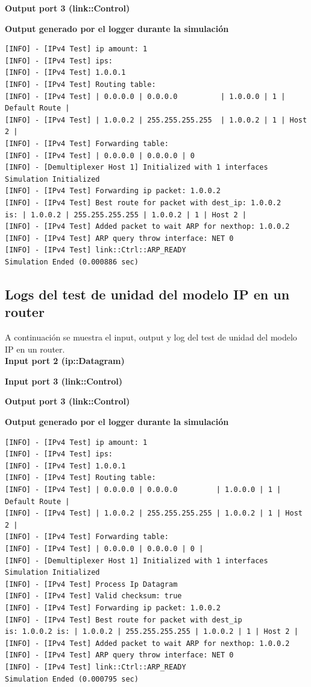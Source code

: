 \documentclass[10pt,a4paper]{article}
\begin{document}
\textbf{Output port 3 (link::Control)}


\textbf{Output generado por el logger durante la simulación}
\begin{lstlisting}
[INFO] - [IPv4 Test] ip amount: 1
[INFO] - [IPv4 Test] ips:
[INFO] - [IPv4 Test] 1.0.0.1
[INFO] - [IPv4 Test] Routing table:
[INFO] - [IPv4 Test] | 0.0.0.0 | 0.0.0.0          | 1.0.0.0 | 1 | Default Route |
[INFO] - [IPv4 Test] | 1.0.0.2 | 255.255.255.255  | 1.0.0.2 | 1 | Host 2 |
[INFO] - [IPv4 Test] Forwarding table:
[INFO] - [IPv4 Test] | 0.0.0.0 | 0.0.0.0 | 0 
[INFO] - [Demultiplexer Host 1] Initialized with 1 interfaces
Simulation Initialized
[INFO] - [IPv4 Test] Forwarding ip packet: 1.0.0.2
[INFO] - [IPv4 Test] Best route for packet with dest_ip: 1.0.0.2 
is: | 1.0.0.2 | 255.255.255.255 | 1.0.0.2 | 1 | Host 2 | 
[INFO] - [IPv4 Test] Added packet to wait ARP for nexthop: 1.0.0.2
[INFO] - [IPv4 Test] ARP query throw interface: NET 0
[INFO] - [IPv4 Test] link::Ctrl::ARP_READY
Simulation Ended (0.000886 sec)
\end{lstlisting}

\newpage

\subsection{Logs del test de unidad del modelo IP en un router}
\label{appendix: ip_router unit test}
A continuación se muestra el input, output y log del test de unidad del modelo IP en un router.\\

\textbf{Input port 2 (ip::Datagram)}


\textbf{Input port 3 (link::Control)}


\textbf{Output port 3 (link::Control)}


\textbf{Output generado por el logger durante la simulación}
\begin{lstlisting}
[INFO] - [IPv4 Test] ip amount: 1
[INFO] - [IPv4 Test] ips:
[INFO] - [IPv4 Test] 1.0.0.1
[INFO] - [IPv4 Test] Routing table:
[INFO] - [IPv4 Test] | 0.0.0.0 | 0.0.0.0         | 1.0.0.0 | 1 | Default Route | 
[INFO] - [IPv4 Test] | 1.0.0.2 | 255.255.255.255 | 1.0.0.2 | 1 | Host 2 | 
[INFO] - [IPv4 Test] Forwarding table:
[INFO] - [IPv4 Test] | 0.0.0.0 | 0.0.0.0 | 0 | 
[INFO] - [Demultiplexer Host 1] Initialized with 1 interfaces
Simulation Initialized
[INFO] - [IPv4 Test] Process Ip Datagram
[INFO] - [IPv4 Test] Valid checksum: true
[INFO] - [IPv4 Test] Forwarding ip packet: 1.0.0.2
[INFO] - [IPv4 Test] Best route for packet with dest_ip 
is: 1.0.0.2 is: | 1.0.0.2 | 255.255.255.255 | 1.0.0.2 | 1 | Host 2 | 
[INFO] - [IPv4 Test] Added packet to wait ARP for nexthop: 1.0.0.2
[INFO] - [IPv4 Test] ARP query throw interface: NET 0
[INFO] - [IPv4 Test] link::Ctrl::ARP_READY
Simulation Ended (0.000795 sec)
\end{lstlisting}
\end{document}
